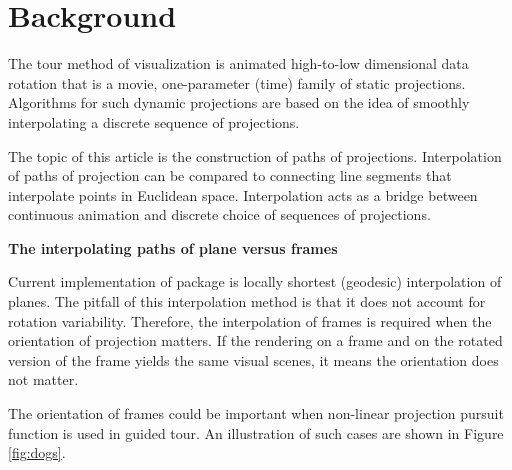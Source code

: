 \hypertarget{background}{%
\section{Background}\label{background}}

The tour method of visualization is animated high-to-low dimensional
data rotation that is a movie, one-parameter (time) family of static
projections. Algorithms for such dynamic projections
\citet{buja_cook_asimov_hurley_2005} are based on the idea of smoothly
interpolating a discrete sequence of projections.

The topic of this article is the construction of paths of projections.
Interpolation of paths of projection can be compared to connecting line
segments that interpolate points in Euclidean space. Interpolation acts
as a bridge between continuous animation and discrete choice of
sequences of projections.

\textbf{The interpolating paths of plane versus frames}

Current implementation of  package is locally shortest
(geodesic) interpolation of planes. The pitfall of this interpolation
method is that it does not account for rotation variability. Therefore,
the interpolation of frames is required when the orientation of
projection matters. If the rendering on a frame and on the rotated
version of the frame yields the same visual scenes, it means the
orientation does not matter.

The orientation of frames could be important when non-linear projection
pursuit function is used in guided tour. An illustration of such cases
are shown in Figure \ref{fig:dogs}.


